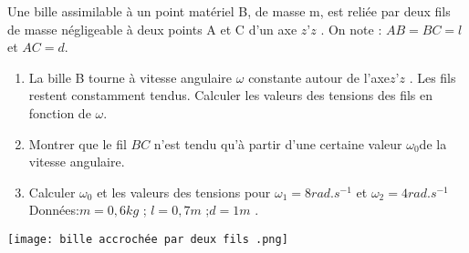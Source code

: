 \documentclass[10pt,a4paper]{article}
\begin{document}
\begin{tcolorbox}[sabour,title=EXERCICE 23]
\begin{minipage}{11cm}


Une bille assimilable à un point matériel B, de masse m, est reliée par deux fils de masse négligeable à deux points A et C d'un axe $z’z$ . On note : $AB = BC = l$ et $AC = d$. 
\begin{enumerate}
\item La bille B tourne à vitesse angulaire $\omega$ constante autour de l'axe$ z’z$ . Les fils restent constamment tendus. Calculer les valeurs des tensions des fils en fonction de $\omega$.
\item Montrer que le fil $BC$ n'est tendu qu'à partir d'une certaine valeur $\omega_0$de la vitesse angulaire. 
\item Calculer $\omega_0$ et les valeurs des tensions pour $\omega_1 = 8rad.s^{-1}$ et $\omega_2 = 4rad.s^{-1}$
Données:$ m = 0,6kg$ ; $l = 0,7m$ ;$ d = 1m$ .

\end{enumerate}
\end{minipage}
\begin{minipage}{8cm}

\texttt{[image: bille accrochée par deux fils .png]} 
\end{minipage}




\end{tcolorbox}
\end{document}
